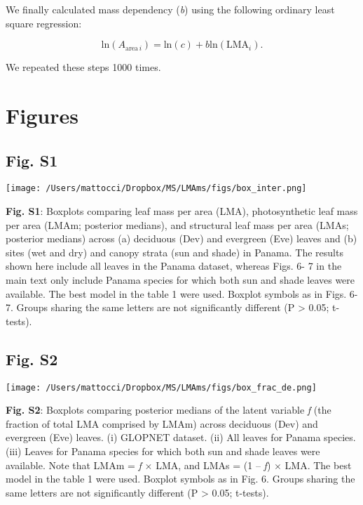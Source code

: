 \documentclass[
  12pt,
  letterpaper,
  DIV=11,
  numbers=noendperiod]{scrartcl}
\begin{document}
We finally calculated mass dependency (\emph{b}) using the following
ordinary least square regression:

\[
\mathrm{ln}(A_{\mathrm{area} \, i}) = \mathrm{ln}(c) + b \mathrm{ln}(\mathrm{LMA}_{i}).
\]

We repeated these steps 1000 times.

\newpage

\hypertarget{figures}{%
\section{Figures}\label{figures}}

\hypertarget{fig.-s1}{%
\subsection{Fig. S1}\label{fig.-s1}}

\texttt{[image: /Users/mattocci/Dropbox/MS/LMAms/figs/box\_inter.png]}

\textbf{Fig. S1}: Boxplots comparing leaf mass per area (LMA),
photosynthetic leaf mass per area (LMAm; posterior medians), and
structural leaf mass per area (LMAs; posterior medians) across (a)
deciduous (Dev) and evergreen (Eve) leaves and (b) sites (wet and dry)
and canopy strata (sun and shade) in Panama. The results shown here
include all leaves in the Panama dataset, whereas Figs. 6- 7 in the main
text only include Panama species for which both sun and shade leaves
were available. The best model in the table 1 were used. Boxplot symbols
as in Figs. 6- 7. Groups sharing the same letters are not significantly
different (P \textgreater{} 0.05; t-tests).

\newpage

\hypertarget{fig.-s2}{%
\subsection{Fig. S2}\label{fig.-s2}}

\texttt{[image: /Users/mattocci/Dropbox/MS/LMAms/figs/box\_frac\_de.png]}

\textbf{Fig. S2}: Boxplots comparing posterior medians of the latent
variable \emph{f} (the fraction of total LMA comprised by LMAm) across
deciduous (Dev) and evergreen (Eve) leaves. (i) GLOPNET dataset. (ii)
All leaves for Panama species. (iii) Leaves for Panama species for which
both sun and shade leaves were available. Note that LMAm = \emph{f}
\(\times\) LMA, and LMAs = (1 -- \emph{f}) \(\times\) LMA. The best
model in the table 1 were used. Boxplot symbols as in Fig. 6. Groups
sharing the same letters are not significantly different (P
\textgreater{} 0.05; t-tests).
\end{document}
